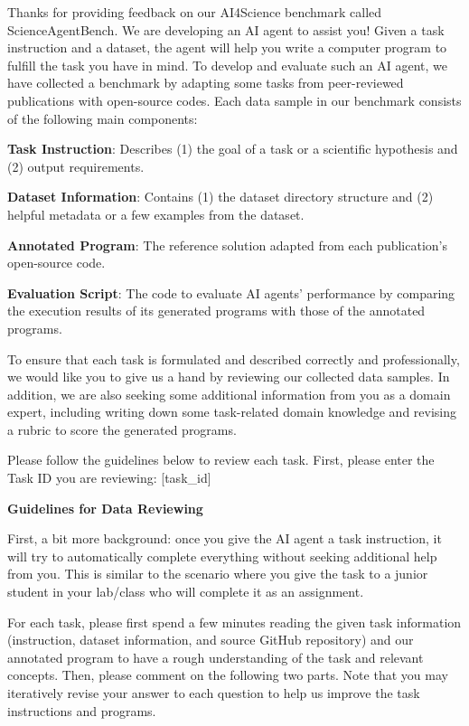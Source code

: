 \begin{tcolorbox}
\small
Thanks for providing feedback on our AI4Science benchmark called ScienceAgentBench.
We are developing an AI agent to assist you! Given a task instruction and a dataset, the agent will help you write a computer program to fulfill the task you have in mind.
To develop and evaluate such an AI agent, we have collected a benchmark by adapting some tasks from peer-reviewed publications with open-source codes. Each data sample in our benchmark consists of the following main components:

\textbf{Task Instruction}: Describes (1) the goal of a task or a scientific hypothesis and (2) output requirements.

\textbf{Dataset Information}: Contains (1) the dataset directory structure and (2) helpful metadata or a few examples from the dataset.

\textbf{Annotated Program}: The reference solution adapted from each publication's open-source code.

\textbf{Evaluation Script}: The code to evaluate AI agents' performance by comparing the execution results of its generated programs with those of the annotated programs.

To ensure that each task is formulated and described correctly and professionally, we would like you to give us a hand by reviewing our collected data samples. In addition, we are also seeking some additional information from you as a domain expert, including writing down some task-related domain knowledge and revising a rubric to score the generated programs.

Please follow the guidelines below to review each task. First, please enter the Task ID you are reviewing: [task\_id]

\textbf{Guidelines for Data Reviewing}

First, a bit more background: once you give the AI agent a task instruction, it will try to automatically complete everything without seeking additional help from you. This is similar to the scenario where you give the task to a junior student in your lab/class who will complete it as an assignment.

For each task, please first spend a few minutes reading the given task information (instruction, dataset information, and source GitHub repository) and our annotated program to have a rough understanding of the task and relevant concepts. Then, please comment on the following two parts. Note that you may iteratively revise your answer to each question to help us improve the task instructions and programs.


\end{tcolorbox}
